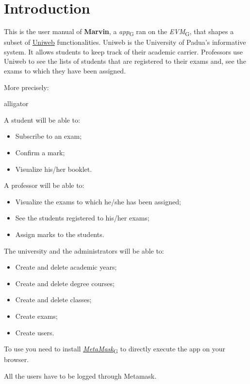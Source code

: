 \section{Introduction}
This is the user manual of \textbf{Marvin}, a \emph{\DH app}\textsubscript{G} ran on the \emph{EVM}\textsubscript{G}, that shapes a subset of \href{www.uniweb.unipd.it}{Uniweb} functionalities. Uniweb is the University of Padua's informative system.
It allows students to keep track of their academic carrier. Professors use Uniweb to see the lists of students that are registered to their exams and, see the exams to which they have been assigned.

More precisely:
\begin{labeling}{alligator}
	\item A student will be able to:
	\begin{itemize}
		\item Subscribe to an exam;
		\item Confirm a mark;
		\item Visualize his/her booklet.
	\end{itemize}
	\item A professor will be able to:
	\begin{itemize}
		\item Visualize the exams to which he/she has been assigned;
		\item See the students registered to his/her exams;
		\item Assign marks to the students.
	\end{itemize}
	\item The university and the administrators will be able to:
	\begin{itemize}
		\item Create and delete academic years;
		\item Create and delete degree courses;
		\item Create and delete classes;
		\item Create exams;
		\item Create users.
	\end{itemize}
\end{labeling}

To use \project{} you need to install \emph{\href{https://metamask.io/}{MetaMask}}\textsubscript{G} to directly execute the \DH app on your browser.

All the users have to be logged through Metamask.